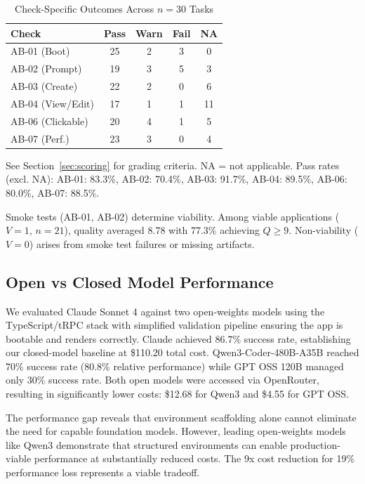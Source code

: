 \documentclass[conference]{IEEEtran}
\begin{document}
\begin{table}[!t]
\caption{Check-Specific Outcomes Across $n=30$ Tasks}
\label{tab:check-pass-rates}
\centering
\small
\begin{threeparttable}
\begin{tabular}{@{}lcccc@{}}
\toprule
\textbf{Check} & \textbf{Pass} & \textbf{Warn} & \textbf{Fail} & \textbf{NA} \\
\midrule
AB-01 (Boot) & 25 & 2 & 3 & 0 \\
AB-02 (Prompt) & 19 & 3 & 5 & 3 \\
AB-03 (Create) & 22 & 2 & 0 & 6 \\
AB-04 (View/Edit) & 17 & 1 & 1 & 11 \\
AB-06 (Clickable) & 20 & 4 & 1 & 5 \\
AB-07 (Perf.) & 23 & 3 & 0 & 4 \\
\bottomrule
\end{tabular}
\begin{tablenotes}\footnotesize
\item See Section~\ref{sec:scoring} for grading criteria. NA = not applicable. Pass rates (excl. NA): AB-01: 83.3\%, AB-02: 70.4\%, AB-03: 91.7\%, AB-04: 89.5\%, AB-06: 80.0\%, AB-07: 88.5\%.
\end{tablenotes}
\end{threeparttable}
\end{table}

Smoke tests (AB-01, AB-02) determine viability. Among viable applications ($V=1$, $n=21$), quality averaged 8.78 with 77.3\% achieving $Q \geq 9$. Non-viability ($V=0$) arises from smoke test failures or missing artifacts.

\subsection{Open vs Closed Model Performance}

We evaluated Claude Sonnet 4 against two open-weights models using the TypeScript/tRPC stack with simplified validation pipeline ensuring the app is bootable and renders correctly. Claude achieved 86.7\% success rate, establishing our closed-model baseline at \$110.20 total cost. Qwen3-Coder-480B-A35B reached 70\% success rate (80.8\% relative performance) while GPT OSS 120B managed only 30\% success rate. Both open models were accessed via OpenRouter, resulting in significantly lower costs: \$12.68 for Qwen3 and \$4.55 for GPT OSS.

The performance gap reveals that environment scaffolding alone cannot eliminate the need for capable foundation models. However, leading open-weights models like Qwen3 demonstrate that structured environments can enable production-viable performance at substantially reduced costs. The 9x cost reduction for 19\% performance loss represents a viable tradeoff.
\end{document}
